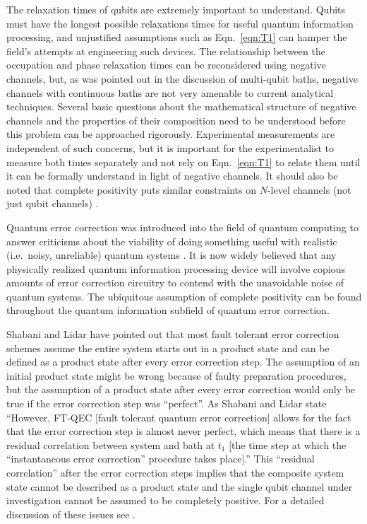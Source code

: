 The relaxation times of qubits are extremely important to understand.  Qubits must have the longest possible relaxations times for useful quantum information processing, and unjustified assumptions such as Eqn.\ \ref{eqn:T1} can hamper the field's attempts at engineering such devices.  The relationship between the occupation and phase relaxation times can be reconsidered using negative channels, but, as was pointed out in the discussion of multi-qubit baths, negative channels with continuous baths are not very amenable to current analytical techniques.  Several basic questions about the mathematical structure of negative channels and the properties of their composition need to be understood before this problem can be approached rigorously.  Experimental measurements are independent of such concerns, but it is important for the experimentalist to measure both times separately and not rely on Eqn.\ \ref{eqn:T1} to relate them until it can be formally understand in light of negative channels.  It should also be noted that complete positivity puts similar constraints on $N$-level channels (not just qubit channels) \cite{Schirmer2004}.

Quantum error correction was introduced into the field of quantum computing to answer criticisms about the viability of doing something useful with realistic (i.e.\ noisy, unreliable) quantum systems \cite{Nielsen2010,Aharonov2008,Shabani2009}.  It is now widely believed that any physically realized quantum information processing device will involve copious amounts of error correction circuitry to contend with the unavoidable noise of quantum systems.  The ubiquitous assumption of complete positivity can be found throughout the quantum information subfield of quantum error correction.  

Shabani and Lidar \cite{Lidar2009} have pointed out that most fault tolerant error correction schemes assume the entire system starts out in a product state and can be defined as a product state after every error correction step.  The assumption of an initial product state might be wrong because of faulty preparation procedures, but the assumption of a product state after every error correction would only be true if the error correction step was ``perfect''.  As Shabani and Lidar state ``However, FT-QEC [fault tolerant quantum error correction] allows for the fact that the error correction step is almost never perfect, which means that there is a residual correlation between system and bath at $t_1$ [the time step at which the ``instantaneous error correction'' procedure takes place].'' \cite{Lidar2009}  This ``residual correlation'' after the error correction steps implies that the composite system state cannot be described as a product state and the single qubit channel under investigation cannot be assumed to be completely positive.  For a detailed discussion of these issues see \cite{Shabani2009}.  

